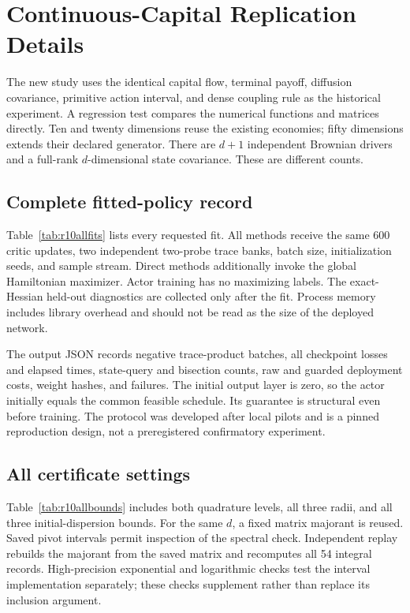 \section{Continuous-Capital Replication Details}\label{supp:r10}
The new study uses the identical capital flow, terminal payoff, diffusion covariance, primitive action interval, and dense coupling rule as the historical experiment. A regression test compares the numerical functions and matrices directly. Ten and twenty dimensions reuse the existing economies; fifty dimensions extends their declared generator. There are $d+1$ independent Brownian drivers and a full-rank $d$-dimensional state covariance. These are different counts.

\subsection{Complete fitted-policy record}
Table~\ref{tab:r10allfits} lists every requested fit. All methods receive the same 600 critic updates, two independent two-probe trace banks, batch size, initialization seeds, and sample stream. Direct methods additionally invoke the global Hamiltonian maximizer. Actor training has no maximizing labels. The exact-Hessian held-out diagnostics are collected only after the fit. Process memory includes library overhead and should not be read as the size of the deployed network.

The output JSON records negative trace-product batches, all checkpoint losses and elapsed times, state-query and bisection counts, raw and guarded deployment costs, weight hashes, and failures. The initial output layer is zero, so the actor initially equals the common feasible schedule. Its guarantee is structural even before training. The protocol was developed after local pilots and is a pinned reproduction design, not a preregistered confirmatory experiment.

\subsection{All certificate settings}
Table~\ref{tab:r10allbounds} includes both quadrature levels, all three radii, and all three initial-dispersion bounds. For the same $d$, a fixed matrix majorant is reused. Saved pivot intervals permit inspection of the spectral check. Independent replay rebuilds the majorant from the saved matrix and recomputes all 54 integral records. High-precision exponential and logarithmic checks test the interval implementation separately; these checks supplement rather than replace its inclusion argument.


